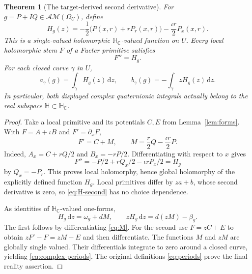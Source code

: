 \documentclass[11pt,a4paper]{article}
\numberwithin{equation}{section}
\newtheorem{theorem}{Theorem}[section]
\theoremstyle{definition}
\theoremstyle{remark}
\newcommand{\C}{\mathbb C}
\newcommand{\HH}{\mathbb H}
\newcommand{\HC}{\mathbb H_{\C}}
\newcommand{\AM}{\mathcal{AM}}
\newcommand{\dd}{\,\mathrm d}
\begin{document}
\begin{theorem}[The target-derived second derivative]\label{thm:H}
For $g=P+IQ\in\AM(\Omega_U)$, define
\begin{equation}
 H_g(z)=-\frac12\bigl(P(x,r)+rP_r(x,r)\bigr)
        -\frac{\iota r}{2}P_x(x,r).\label{eq:H}
\end{equation}
This is a single-valued holomorphic $\HC$-valued function on $U$.
Every local holomorphic stem $F$ of a Fueter primitive satisfies
\begin{equation}
 F''=H_g.\label{eq:H-second}
\end{equation}
For each closed curve $\gamma$ in $U$,
\begin{equation}
 a_\gamma(g)=\int_\gamma H_g(z)\dd z,\qquad
 b_\gamma(g)=-\int_\gamma zH_g(z)\dd z.\label{eq:complex-periods}
\end{equation}
In particular, both displayed complex quaternionic integrals actually
belong to the real subspace $\HH\subset\HC$.
\end{theorem}
\begin{proof}
Take a local primitive and its potentials $C,E$ from
Lemma~\ref{lem:forms}. With $F=A+\iota B$ and $F'=\partial_xF$,
\begin{equation}
 F'=C+M,\qquad M=\frac r2Q-\frac{\iota r}{2}P.\label{eq:M}
\end{equation}
Indeed, $A_x=C+rQ/2$ and $B_x=-rP/2$.
Differentiating with respect to $x$ gives
\[
 F''=-P/2+rQ_x/2-\iota rP_x/2=H_g
\]
by $Q_x=-P_r$. This proves local holomorphy, hence global holomorphy
of the explicitly defined function $H_g$. Local primitives differ by
$za+b$, whose second derivative is zero, so \eqref{eq:H-second} has no
choice dependence.

As identities of $\HC$-valued one-forms,
\begin{equation}
 H_g\dd z=\omega_g+dM,\qquad
 zH_g\dd z=d(zM)-\beta_g.\label{eq:exact-corrections}
\end{equation}
The first follows by differentiating \eqref{eq:M}. For the second use
$F=zC+E$ to obtain $zF'-F=zM-E$ and then differentiate. The functions
$M$ and $zM$ are globally single valued. Their differentials integrate to
zero around a closed curve, yielding \eqref{eq:complex-periods}.
The original definitions \eqref{eq:periods} prove the final reality
assertion.
\end{proof}
\end{document}
